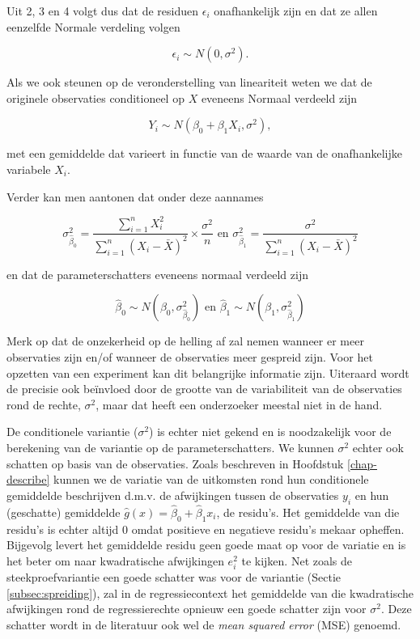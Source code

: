 \documentclass[
  12pt,dutch]{book}
\theoremstyle{definition}
\theoremstyle{definition}
\theoremstyle{definition}
\theoremstyle{definition}
\theoremstyle{remark}
\begin{document}
Uit 2, 3 en 4 volgt dus dat de residuen \(\epsilon_i\) onafhankelijk zijn en dat ze allen eenzelfde Normale verdeling volgen

\[\epsilon_i \sim N(0,\sigma^2).\]

Als we ook steunen op de veronderstelling van lineariteit weten we dat de originele observaties conditioneel op \(X\) eveneens Normaal verdeeld zijn

\[Y_i\sim N(\beta_0+\beta_1 X_i,\sigma^2),\]

met een gemiddelde dat varieert in functie van de waarde van de onafhankelijke variabele \(X_i\).

Verder kan men aantonen dat onder deze aannames

\[\sigma^2_{\hat{\beta}_0}=\frac{\sum\limits_{i=1}^n X^2_i}{\sum\limits_{i=1}^n (X_i-\bar X)^2} \times\frac{\sigma^2}{n} \text{ en } \sigma^2_{\hat{\beta}_1}=\frac{\sigma^2}{\sum\limits_{i=1}^n (X_i-\bar X)^2}\]

en dat de parameterschatters eveneens normaal verdeeld zijn

\[\hat\beta_0 \sim N\left(\beta_0,\sigma^2_{\hat \beta_0}\right) \text{ en } \hat\beta_1 \sim N\left(\beta_1,\sigma^2_{\hat \beta_1}\right)\]

Merk op dat de onzekerheid op de helling af zal nemen wanneer er meer observaties zijn en/of wanneer de observaties meer gespreid zijn. Voor het opzetten van een experiment kan dit belangrijke informatie zijn. Uiteraard wordt de precisie ook beïnvloed door de grootte van de variabiliteit van de observaties rond de rechte, \(\sigma^2\), maar dat heeft een onderzoeker meestal niet in de hand.

De conditionele variantie (\(\sigma^2\)) is echter niet gekend en is noodzakelijk voor de berekening van de variantie op de parameterschatters. We kunnen \(\sigma^2\) echter ook schatten op basis van de observaties.
Zoals beschreven in Hoofdstuk \ref{chap-describe} kunnen we de variatie van de uitkomsten rond hun conditionele gemiddelde beschrijven d.m.v. de afwijkingen tussen de observaties \(y_i\) en hun (geschatte) gemiddelde \(\hat{g}(x)=\hat{\beta}_0+\hat{\beta}_1x_i\), de residu's.
Het gemiddelde van die residu's is echter altijd 0 omdat positieve en negatieve residu's mekaar
opheffen. Bijgevolg levert het gemiddelde residu geen goede maat op voor de variatie en is het beter om naar kwadratische afwijkingen \(e_i^2\) te kijken.
Net zoals de steekproefvariantie een goede schatter was voor de variantie (Sectie \ref{subsec:spreiding}), zal in de regressiecontext het gemiddelde van die kwadratische afwijkingen rond de regressierechte opnieuw een goede schatter zijn voor \(\sigma^2\). Deze schatter wordt in de literatuur ook wel de \emph{mean squared error} (MSE) genoemd.
\end{document}
